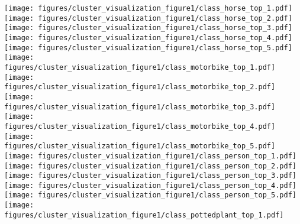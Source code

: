 \documentclass{article}
\begin{document}
\begin{figure*}[htbp]
\texttt{[image: figures/cluster\_visualization\_figure1/class\_horse\_top\_1.pdf]}\hspace{-0.12cm}
\texttt{[image: figures/cluster\_visualization\_figure1/class\_horse\_top\_2.pdf]}\hspace{-0.12cm}
\texttt{[image: figures/cluster\_visualization\_figure1/class\_horse\_top\_3.pdf]}\hspace{-0.12cm}
\texttt{[image: figures/cluster\_visualization\_figure1/class\_horse\_top\_4.pdf]}\hspace{-0.12cm}
\texttt{[image: figures/cluster\_visualization\_figure1/class\_horse\_top\_5.pdf]}\hspace{0.2cm}
\texttt{[image: figures/cluster\_visualization\_figure1/class\_motorbike\_top\_1.pdf]}\hspace{-0.12cm}
\texttt{[image: figures/cluster\_visualization\_figure1/class\_motorbike\_top\_2.pdf]}\hspace{-0.12cm}
\texttt{[image: figures/cluster\_visualization\_figure1/class\_motorbike\_top\_3.pdf]}\hspace{-0.12cm}
\texttt{[image: figures/cluster\_visualization\_figure1/class\_motorbike\_top\_4.pdf]}\hspace{-0.12cm}
\texttt{[image: figures/cluster\_visualization\_figure1/class\_motorbike\_top\_5.pdf]}\vspace{0.2cm}\\
\texttt{[image: figures/cluster\_visualization\_figure1/class\_person\_top\_1.pdf]}\hspace{-0.12cm}
\texttt{[image: figures/cluster\_visualization\_figure1/class\_person\_top\_2.pdf]}\hspace{-0.12cm}
\texttt{[image: figures/cluster\_visualization\_figure1/class\_person\_top\_3.pdf]}\hspace{-0.12cm}
\texttt{[image: figures/cluster\_visualization\_figure1/class\_person\_top\_4.pdf]}\hspace{-0.12cm}
\texttt{[image: figures/cluster\_visualization\_figure1/class\_person\_top\_5.pdf]}\hspace{0.2cm}
\texttt{[image: figures/cluster\_visualization\_figure1/class\_pottedplant\_top\_1.pdf]}\hspace{-0.12cm}

\end{figure*}
\end{document}
